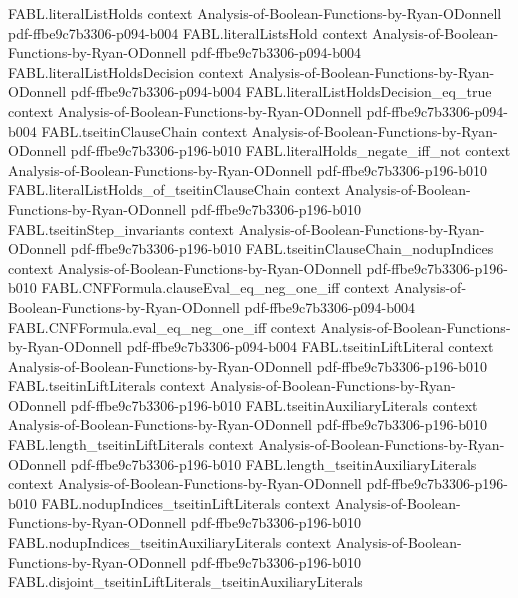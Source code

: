 \begin{theorem}
\proofstep
  {FABL.literalListHolds}
  {context}
  {Analysis-of-Boolean-Functions-by-Ryan-ODonnell}
  {pdf-ffbe9c7b3306-p094-b004}
\proofstep
  {FABL.literalListsHold}
  {context}
  {Analysis-of-Boolean-Functions-by-Ryan-ODonnell}
  {pdf-ffbe9c7b3306-p094-b004}
\proofstep
  {FABL.literalListHoldsDecision}
  {context}
  {Analysis-of-Boolean-Functions-by-Ryan-ODonnell}
  {pdf-ffbe9c7b3306-p094-b004}
\proofstep
  {FABL.literalListHoldsDecision_eq_true}
  {context}
  {Analysis-of-Boolean-Functions-by-Ryan-ODonnell}
  {pdf-ffbe9c7b3306-p094-b004}
\proofstep
  {FABL.tseitinClauseChain}
  {context}
  {Analysis-of-Boolean-Functions-by-Ryan-ODonnell}
  {pdf-ffbe9c7b3306-p196-b010}
\proofstep
  {FABL.literalHolds_negate_iff_not}
  {context}
  {Analysis-of-Boolean-Functions-by-Ryan-ODonnell}
  {pdf-ffbe9c7b3306-p196-b010}
\proofstep
  {FABL.literalListHolds_of_tseitinClauseChain}
  {context}
  {Analysis-of-Boolean-Functions-by-Ryan-ODonnell}
  {pdf-ffbe9c7b3306-p196-b010}
\proofstep
  {FABL.tseitinStep_invariants}
  {context}
  {Analysis-of-Boolean-Functions-by-Ryan-ODonnell}
  {pdf-ffbe9c7b3306-p196-b010}
\proofstep
  {FABL.tseitinClauseChain_nodupIndices}
  {context}
  {Analysis-of-Boolean-Functions-by-Ryan-ODonnell}
  {pdf-ffbe9c7b3306-p196-b010}
\proofstep
  {FABL.CNFFormula.clauseEval_eq_neg_one_iff}
  {context}
  {Analysis-of-Boolean-Functions-by-Ryan-ODonnell}
  {pdf-ffbe9c7b3306-p094-b004}
\proofstep
  {FABL.CNFFormula.eval_eq_neg_one_iff}
  {context}
  {Analysis-of-Boolean-Functions-by-Ryan-ODonnell}
  {pdf-ffbe9c7b3306-p094-b004}
\proofstep
  {FABL.tseitinLiftLiteral}
  {context}
  {Analysis-of-Boolean-Functions-by-Ryan-ODonnell}
  {pdf-ffbe9c7b3306-p196-b010}
\proofstep
  {FABL.tseitinLiftLiterals}
  {context}
  {Analysis-of-Boolean-Functions-by-Ryan-ODonnell}
  {pdf-ffbe9c7b3306-p196-b010}
\proofstep
  {FABL.tseitinAuxiliaryLiterals}
  {context}
  {Analysis-of-Boolean-Functions-by-Ryan-ODonnell}
  {pdf-ffbe9c7b3306-p196-b010}
\proofstep
  {FABL.length_tseitinLiftLiterals}
  {context}
  {Analysis-of-Boolean-Functions-by-Ryan-ODonnell}
  {pdf-ffbe9c7b3306-p196-b010}
\proofstep
  {FABL.length_tseitinAuxiliaryLiterals}
  {context}
  {Analysis-of-Boolean-Functions-by-Ryan-ODonnell}
  {pdf-ffbe9c7b3306-p196-b010}
\proofstep
  {FABL.nodupIndices_tseitinLiftLiterals}
  {context}
  {Analysis-of-Boolean-Functions-by-Ryan-ODonnell}
  {pdf-ffbe9c7b3306-p196-b010}
\proofstep
  {FABL.nodupIndices_tseitinAuxiliaryLiterals}
  {context}
  {Analysis-of-Boolean-Functions-by-Ryan-ODonnell}
  {pdf-ffbe9c7b3306-p196-b010}
\proofstep
  {FABL.disjoint_tseitinLiftLiterals_tseitinAuxiliaryLiterals}

\end{theorem}
